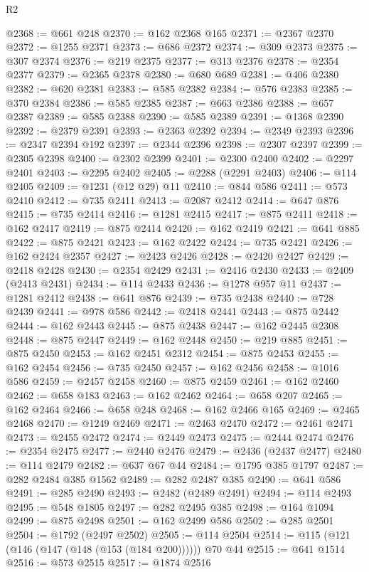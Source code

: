 \begin{lexlean}{R2}
\begin{coremodule}
@2368 := @661 @248
@2370 := @162 @2368 @165
@2371 := @2367 @2370
@2372 := @1255 @2371
@2373 := @686 @2372
@2374 := @309 @2373
@2375 := @307 @2374
@2376 := @219 @2375
@2377 := @313 @2376
@2378 := @2354 @2377
@2379 := @2365 @2378
@2380 := @680 @689
@2381 := @406 @2380
@2382 := @620 @2381
@2383 := @585 @2382
@2384 := @576 @2383
@2385 := @370 @2384
@2386 := @585 @2385
@2387 := @663 @2386
@2388 := @657 @2387
@2389 := @585 @2388
@2390 := @585 @2389
@2391 := @1368 @2390
@2392 := @2379 @2391
@2393 := @2363 @2392
@2394 := @2349 @2393
@2396 := @2347 @2394 @192
@2397 := @2344 @2396
@2398 := @2307 @2397
@2399 := @2305 @2398
@2400 := @2302 @2399
@2401 := @2300 @2400
@2402 := @2297 @2401
@2403 := @2295 @2402
@2405 := @2288 (@2291 @2403)
@2406 := @114 @2405
@2409 := @1231 (@12 @29) @11
@2410 := @844 @586
@2411 := @573 @2410
@2412 := @735 @2411
@2413 := @2087 @2412
@2414 := @647 @876
@2415 := @735 @2414
@2416 := @1281 @2415
@2417 := @875 @2411
@2418 := @162 @2417
@2419 := @875 @2414
@2420 := @162 @2419
@2421 := @641 @885
@2422 := @875 @2421
@2423 := @162 @2422
@2424 := @735 @2421
@2426 := @162 @2424 @2357
@2427 := @2423 @2426
@2428 := @2420 @2427
@2429 := @2418 @2428
@2430 := @2354 @2429
@2431 := @2416 @2430
@2433 := @2409 (@2413 @2431)
@2434 := @114 @2433
@2436 := @1278 @957 @11
@2437 := @1281 @2412
@2438 := @641 @876
@2439 := @735 @2438
@2440 := @728 @2439
@2441 := @978 @586
@2442 := @2418 @2441
@2443 := @875 @2442
@2444 := @162 @2443
@2445 := @875 @2438
@2447 := @162 @2445 @2308
@2448 := @875 @2447
@2449 := @162 @2448
@2450 := @219 @885
@2451 := @875 @2450
@2453 := @162 @2451 @2312
@2454 := @875 @2453
@2455 := @162 @2454
@2456 := @735 @2450
@2457 := @162 @2456
@2458 := @1016 @586
@2459 := @2457 @2458
@2460 := @875 @2459
@2461 := @162 @2460
@2462 := @658 @183
@2463 := @162 @2462
@2464 := @658 @207
@2465 := @162 @2464
@2466 := @658 @248
@2468 := @162 @2466 @165
@2469 := @2465 @2468
@2470 := @1249 @2469
@2471 := @2463 @2470
@2472 := @2461 @2471
@2473 := @2455 @2472
@2474 := @2449 @2473
@2475 := @2444 @2474
@2476 := @2354 @2475
@2477 := @2440 @2476
@2479 := @2436 (@2437 @2477)
@2480 := @114 @2479
@2482 := @637 @67 @44
@2484 := @1795 @385 @1797
@2487 := @282 @2484 @385 @1562
@2489 := @282 @2487 @385
@2490 := @641 @586
@2491 := @285 @2490
@2493 := @2482 (@2489 @2491)
@2494 := @114 @2493
@2495 := @548 @1805
@2497 := @282 @2495 @385
@2498 := @164 @1094
@2499 := @875 @2498
@2501 := @162 @2499 @586
@2502 := @285 @2501
@2504 := @1792 (@2497 @2502)
@2505 := @114 @2504
@2514 := @115 (@121 (@146 (@147 (@148 (@153 (@184 @200)))))) @70 @44
@2515 := @641 @1514
@2516 := @573 @2515
@2517 := @1874 @2516

\end{coremodule}
\end{lexlean}
